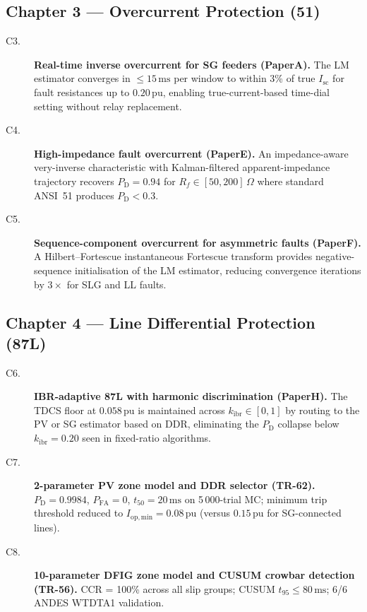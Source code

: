 \documentclass
    [phd,synopsis]
    {iitmdissertation}
\newcommand{\pu}{\,\text{pu}}
\newcommand{\ms}{\,\text{ms}}
\newcommand{\PD}{P_{\mathrm{D}}}
\newcommand{\PFA}{P_{\mathrm{FA}}}
\newcommand{\kibr}{k_{\mathrm{ibr}}}
\begin{document}
\subsection*{Chapter 3 — Overcurrent Protection (51)}

\begin{description}
  \item[C3.] \textbf{Real-time inverse overcurrent for SG feeders (PaperA).}
    The LM estimator converges in $\leq 15\ms$ per window to within
    3\% of true $I_{\mathrm{sc}}$ for fault resistances up to $0.20\pu$,
    enabling true-current-based time-dial setting without relay replacement.

  \item[C4.] \textbf{High-impedance fault overcurrent (PaperE).}
    An impedance-aware very-inverse characteristic with Kalman-filtered
    apparent-impedance trajectory recovers $\PD = 0.94$ for
    $R_f \in [50, 200]\,\Omega$ where standard ANSI~51 produces $\PD < 0.3$.

  \item[C5.] \textbf{Sequence-component overcurrent for asymmetric faults
    (PaperF).}
    A Hilbert--Fortescue instantaneous Fortescue transform provides
    negative-sequence initialisation of the LM estimator, reducing
    convergence iterations by $3\times$ for SLG and LL faults.
\end{description}

\subsection*{Chapter 4 — Line Differential Protection (87L)}

\begin{description}
  \item[C6.] \textbf{IBR-adaptive 87L with harmonic discrimination (PaperH).}
    The TDCS floor at $0.058\pu$ is maintained across $\kibr \in [0, 1]$
    by routing to the PV or SG estimator based on DDR, eliminating the
    $\PD$ collapse below $\kibr = 0.20$ seen in fixed-ratio algorithms.

  \item[C7.] \textbf{2-parameter PV zone model and DDR selector (TR-62).}
    $\PD = 0.9984$, $\PFA = 0$, $t_{50} = 20\ms$ on 5\,000-trial MC;
    minimum trip threshold reduced to $I_{\mathrm{op,min}} = 0.08\pu$
    (versus $0.15\pu$ for SG-connected lines).

  \item[C8.] \textbf{10-parameter DFIG zone model and CUSUM crowbar
    detection (TR-56).}
    CCR = 100\% across all slip groups; CUSUM $t_{95} \leq 80\ms$;
    6/6 ANDES WTDTA1 validation.
\end{description}
\end{document}
